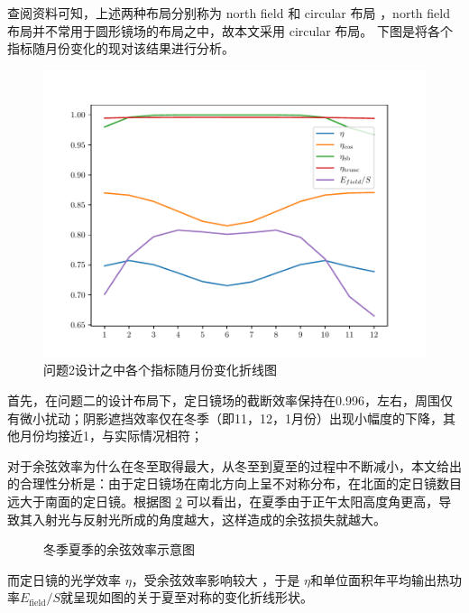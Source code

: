 查阅资料可知，上述两种布局分别称为 north field 和 circular 布局 \cite{zhangML}，north field 布局并不常用于圆形镜场的布局之中，故本文采用 circular 布局。
下图是将各个指标随月份变化的现对该结果进行分析。
%
\begin{figure}[H]
\centering
\includegraphics[scale=0.7]{zhexiantu2.pdf}
\caption{\kaishu 问题2设计之中各个指标随月份变化折线图}\label{fig:zhexiantu2}
\end{figure}
%
首先，在问题二的设计布局下，定日镜场的截断效率保持在0.996，左右，周围仅有微小扰动；阴影遮挡效率仅在冬季（即11，12，1月份）出现小幅度的下降，其他月份均接近1，与实际情况相符；

对于余弦效率为什么在冬至取得最大，从冬至到夏至的过程中不断减小，本文给出的合理性分析是：由于定日镜场在南北方向上呈不对称分布，在北面的定日镜数目远大于南面的定日镜。根据图 \ref{summer_winter} 可以看出，在夏季由于正午太阳高度角更高，导致其入射光与反射光所成的角度越大，这样造成的余弦损失就越大。
%
\begin{figure}[H]
\centering

\caption{\kaishu 冬季夏季的余弦效率示意图}\label{summer_winter}
\end{figure}
%
而定日镜的光学效率 \(\eta\)，受余弦效率影响较大 \cite{zhangML}，于是
\(\eta\)和单位面积年平均输出热功率\(E_{\mathrm{field}}/S\)就呈现如图的关于夏至对称的变化折线形状。

